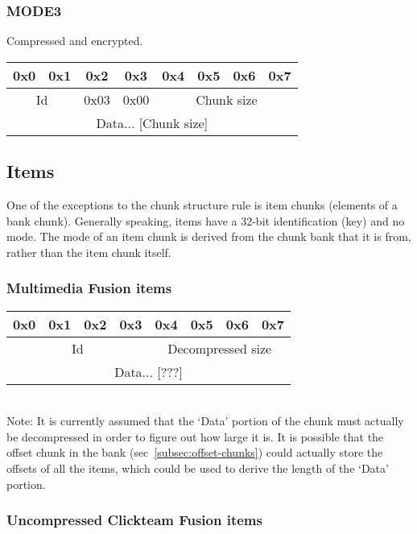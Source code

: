 \documentclass{article}
\begin{document}
\subsubsection{MODE3}
Compressed and encrypted.
\\
\begin{tabular}{c|c|c|c|c|c|c|c}
  0x0 & 0x1 & 0x2 & 0x3 & 0x4 & 0x5 & 0x6 & 0x7
  \\ \hline
  \multicolumn{2}{|c|}{Id} &
  0x03 & 0x00 &
  \multicolumn{4}{|c|}{Chunk size}
  \\ \hline
  \multicolumn{8}{|c}{Data... [Chunk size]}
  \\ \hline
\end{tabular}

\subsection{Items}
\label{subsec:items}

One of the exceptions to the chunk structure rule is item chunks (elements of
a bank chunk).
Generally speaking, items have a 32-bit identification (key) and no mode.
The mode of an item chunk is derived from the chunk bank that it is
from, rather than the item chunk itself.

\subsubsection[MMF items]{Multimedia Fusion items}

\begin{tabular}{c|c|c|c|c|c|c|c}
  0x0 & 0x1 & 0x2 & 0x3 & 0x4 & 0x5 & 0x6 & 0x7
  \\ \hline
  \multicolumn{4}{|c|}{Id} &
  \multicolumn{4}{|c|}{Decompressed size}
  \\ \hline
  \multicolumn{8}{|c}{Data... [???]}
  \\ \hline
\end{tabular}
\\
Note: It is currently assumed that the `Data' portion of the chunk must
actually be decompressed in order to figure out how large it is.
It is possible that the offset chunk in the bank
(sec~\ref{subsec:offset-chunks}) could actually store the offsets of all the
items, which could be used to derive the length of the `Data' portion.

\subsubsection[Uncompressed CTF items]{Uncompressed Clickteam Fusion items}
\end{document}
